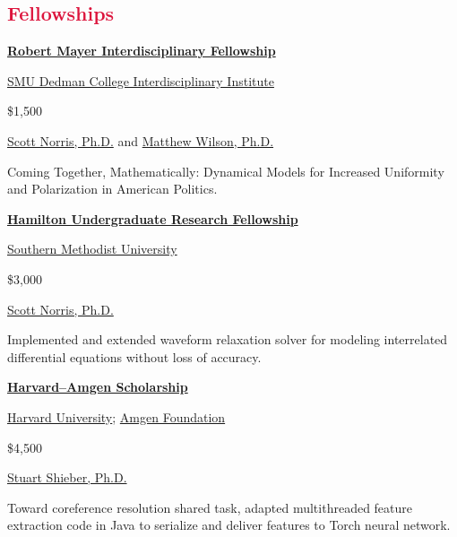 \documentclass[margin, 10pt]{res} %
\let\oldsection\section
\renewcommand{\section}[1]{\oldsection{\textcolor{crimson}{#1}}}
\newcommand{\SMU}{\href{https://www.smu.edu/}{Southern Methodist University}}
\begin{document}
\begin{resume}

\section{Fellowships}

\textbf{\href{http://www.smu.edu/Dedman/DCII/Programs/Mayer}{Robert Mayer Interdisciplinary Fellowship}}
\begin{description}[nosep, labelindent=1em]
\item[Awarding body:] \href{http://www.smu.edu/Dedman/DCII}{SMU Dedman College Interdisciplinary Institute}
\item[Amount:] \$1,500
\item[Supervisor:] \href{http://faculty.smu.edu/snorris/}{Scott Norris, Ph.D.} and \href{https://www.smu.edu/News/Experts/Matthew-Wilson}{Matthew Wilson, Ph.D.}
\item Coming Together, Mathematically: Dynamical Models for Increased Uniformity and Polarization in American Politics.
\end{description}

\begin{samepage}
\textbf{\href{http://www.smu.edu/Dedman/DCII/Programs/Hamilton}{Hamilton Undergraduate Research Fellowship}}
\begin{description}[nosep, labelindent=1em]
\item[Awarding body:] \SMU
\item[Amount:] \$3,000
\item[Supervisor:] \href{http://faculty.smu.edu/snorris/}{Scott Norris, Ph.D.}
\item Implemented and extended waveform relaxation solver for modeling interrelated differential equations without loss of accuracy.
\end{description}
\end{samepage}


\textbf{\href{https://uraf.harvard.edu/amgen-scholars}{Harvard--Amgen Scholarship}}
\begin{description}[nosep, labelindent=1em]
\item[Awarding body:] \href{https://uraf.harvard.edu/home}{Harvard University}; \href{http://www.amgen.com/responsibility/amgen-foundation/}{Amgen Foundation}
\item[Amount:] \$4,500
\item[Supervisor:] \href{http://www.eecs.harvard.edu/shieber/}{Stuart Shieber, Ph.D.}
\item Toward coreference resolution shared task, adapted multithreaded feature extraction code in Java to serialize and deliver features to Torch neural network.
\end{description}


\end{resume}
\end{document}
